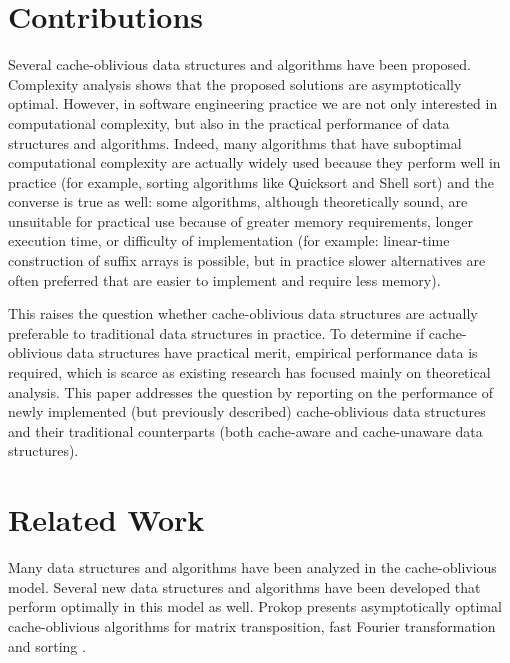 \documentclass{acm_proc_article-sp}
\begin{document}


\section{Contributions}
Several cache-oblivious data structures and algorithms have been proposed. Complexity analysis shows that the proposed solutions are asymptotically optimal. However, in software engineering practice we are not only interested in computational complexity, but also in the practical performance of data structures and algorithms. Indeed, many algorithms that have suboptimal computational complexity are actually widely used because they perform well in practice (for example, sorting algorithms like Quicksort and Shell sort) and the converse is true as well: some algorithms, although theoretically sound, are unsuitable for practical use because of greater memory requirements, longer execution time, or difficulty of implementation (for example: linear-time construction of suffix arrays is possible, but in practice slower alternatives are often preferred that are easier to implement and require less memory).

This raises the question whether cache-oblivious data structures are actually preferable to traditional data structures in practice. To determine if cache-oblivious data structures have practical merit, empirical performance data is required, which is scarce as existing research has focused mainly on theoretical analysis. This paper addresses the question by reporting on the performance of newly implemented (but previously described) cache-oblivious data structures and their traditional counterparts (both cache-aware and cache-unaware data structures).

\section{Related Work}
Many data structures and algorithms have been analyzed in the cache-oblivious model. Several new data structures and algorithms have been developed that perform optimally in this mo\-del as well. Prokop presents asymptotically optimal cache-oblivious algorithms for matrix transposition, fast Fourier transformation and sorting \cite{prokop1999coa}.
\end{document}
